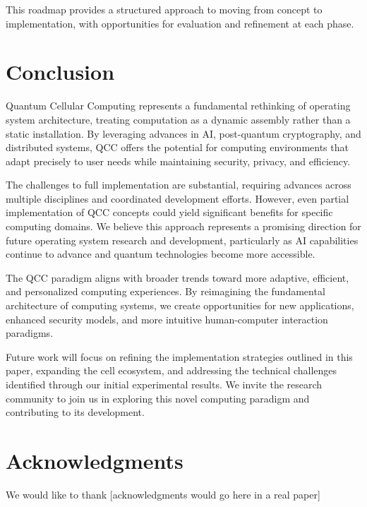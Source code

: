 \documentclass[11pt,a4paper]{article}
\begin{document}
This roadmap provides a structured approach to moving from concept to implementation, with opportunities for evaluation and refinement at each phase.

\section{Conclusion}

Quantum Cellular Computing represents a fundamental rethinking of operating system architecture, treating computation as a dynamic assembly rather than a static installation. By leveraging advances in AI, post-quantum cryptography, and distributed systems, QCC offers the potential for computing environments that adapt precisely to user needs while maintaining security, privacy, and efficiency.

The challenges to full implementation are substantial, requiring advances across multiple disciplines and coordinated development efforts. However, even partial implementation of QCC concepts could yield significant benefits for specific computing domains. We believe this approach represents a promising direction for future operating system research and development, particularly as AI capabilities continue to advance and quantum technologies become more accessible.

The QCC paradigm aligns with broader trends toward more adaptive, efficient, and personalized computing experiences. By reimagining the fundamental architecture of computing systems, we create opportunities for new applications, enhanced security models, and more intuitive human-computer interaction paradigms.

Future work will focus on refining the implementation strategies outlined in this paper, expanding the cell ecosystem, and addressing the technical challenges identified through our initial experimental results. We invite the research community to join us in exploring this novel computing paradigm and contributing to its development.

\section*{Acknowledgments}

We would like to thank [acknowledgments would go here in a real paper]
\end{document}
